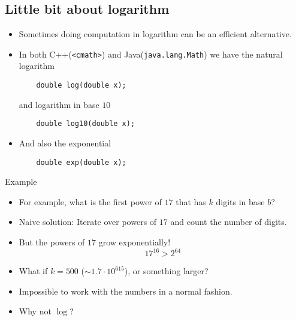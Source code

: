 \documentclass[12pt,t]{beamer}
\newcommand{\bi}{\begin{itemize}}
\newcommand{\ei}{\end{itemize}}
\begin{document}
\subsection{Little bit about logarithm}
\begin{frame}[fragile]
  \vspace{30pt}
  \bi
    \item Sometimes doing computation in logarithm can be an efficient alternative.

  \item In both C++(\texttt{\color{gray}<cmath>}) and
    Java(\texttt{\color{gray}java.lang.Math}) we have the natural logarithm
      \begin{verbatim}
    double log(double x);
      \end{verbatim}

      and logarithm in base $10$
      \begin{verbatim}
    double log10(double x);
      \end{verbatim}
  \item And also the exponential
    \begin{verbatim}
    double exp(double x);
    \end{verbatim}
  \ei
\end{frame}

\begin{frame}[fragile]{Example}
  \vspace{20pt}
  \bi
    \item For example, what is the first power of $17$ that has $k$ digits in base $b$?
    \item {\color{title}Naive solution}: Iterate over powers of $17$ and count the number of digits.
    \item But the powers of $17$ grow exponentially!
      \[17^{16} > 2^{64}\]
    \item What if $k = 500$ ($\sim1.7 \cdot 10^{615}$), or something larger?
    \item Impossible to work with the numbers in a normal fashion.
    \item Why not $\log$?
  \ei
\end{frame}
\end{document}
